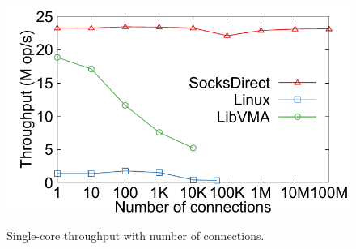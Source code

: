 \begin{figure}[t!]
\begin{minipage}{.31\textwidth}
{			%
			\centering
			\includegraphics[width=\textwidth]{eval/microbenchmark/connnum-ipc-tput.pdf}
			\label{fig:eval-connnum-ipc-tput}
		}
		\vspace{-10pt}
		\vspace{-5pt}
		\caption{Single-core throughput with number of connections.}
		\label{fig:eval-connnum-tput}
	\end{minipage}
	\fi
	\vspace{-10pt}
\end{figure}



